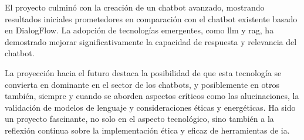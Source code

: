 El proyecto culminó con la creación de un chatbot avanzado, mostrando resultados iniciales prometedores en comparación con el chatbot existente basado en DialogFlow. La adopción de tecnologías emergentes, como \acrshort{llm} y \acrshort{rag}, ha demostrado mejorar significativamente la capacidad de respuesta y relevancia del chatbot.

La proyección hacia el futuro destaca la posibilidad de que esta tecnología se convierta en dominante en el sector de los chatbots, y posiblemente en otros también, siempre y cuando se aborden aspectos críticos como las alucinaciones, la validación de modelos de lenguaje y consideraciones éticas y energéticas. Ha sido un proyecto fascinante, no solo en el aspecto tecnológico, sino también a la reflexión continua sobre la implementación ética y eficaz de herramientas de \acrshort{ia}.